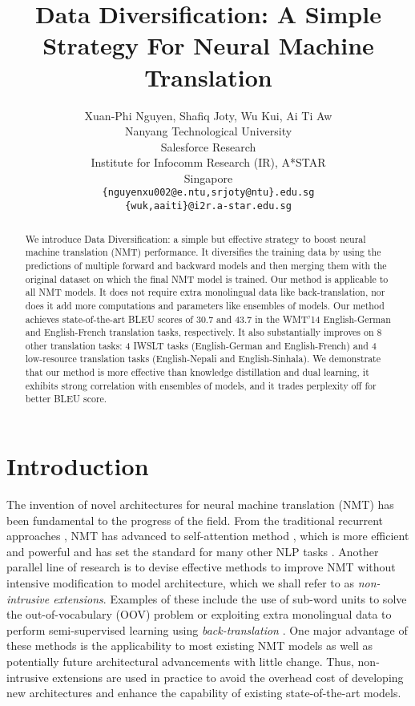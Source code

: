 \documentclass{article}
\title{Data Diversification: {A Simple Strategy For Neural Machine Translation}}
\author{Xuan-Phi Nguyen, Shafiq Joty, Wu Kui, Ai Ti Aw \\
  Nanyang Technological University\\
  Salesforce Research\\
  Institute for Infocomm Research (IR), A*STAR \\
  Singapore \\
  \texttt{\{nguyenxu002@e.ntu,srjoty@ntu\}.edu.sg}\\
  \texttt{\{wuk,aaiti\}@i2r.a-star.edu.sg}
  }
\begin{document}
\maketitle
\begin{abstract}
We introduce Data Diversification: a simple but effective strategy to boost neural machine translation (NMT) performance. It diversifies the training data by using the predictions of multiple forward and backward models and then merging them with the original dataset on which the final NMT model is trained. Our method is applicable to all NMT models. It does not require extra monolingual data like back-translation, nor does it add more computations and parameters like ensembles of models. Our method achieves state-of-the-art BLEU scores of 30.7 and 43.7 in the WMT'14 English-German and English-French translation tasks, respectively. It also substantially improves on 8 other translation tasks: 4 IWSLT tasks (English-German and English-French) and 4 low-resource translation tasks (English-Nepali and English-Sinhala). We demonstrate that our method is more effective than knowledge distillation and dual learning, it exhibits strong correlation with ensembles of models, and it trades perplexity off for better BLEU score.
\end{abstract}

\section{Introduction} \label{sec:intro}
The invention of novel architectures for neural machine translation (NMT) has been fundamental to the progress of the field. From the traditional recurrent approaches \citep{SutskeverNIPS2014,luong2015effective}, NMT has advanced to self-attention method \citep{vaswani2017attention}, which is more efficient and powerful and has set the standard for many other NLP tasks \citep{devlin2018bert}. 
Another parallel line of research is to devise effective methods to improve NMT without intensive modification to model architecture, which we shall refer to as \emph{non-intrusive extensions}. Examples of these include the use of sub-word units to solve the out-of-vocabulary (OOV) problem \citep{sennrich2015neural} or exploiting extra monolingual data to perform semi-supervised learning using \emph{back-translation} \citep{backtranslate_sennrich-etal-2016-improving,understanding_backtranslation_scale}. One major advantage of these methods is the applicability to most existing NMT models as well as potentially future architectural advancements with little change. Thus, non-intrusive extensions are used in practice to avoid the overhead cost of developing new architectures and enhance the capability of existing state-of-the-art models.  
\end{document}
